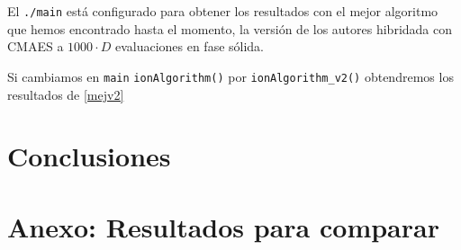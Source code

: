 \documentclass[a4paper,11pt]{article}
\begin{document}
El \texttt{./main} está configurado para obtener los resultados con el mejor algoritmo que hemos encontrado hasta el momento,
la versión de los autores hibridada con CMAES a $1000\cdot D$ evaluaciones en fase sólida.

Si cambiamos en \texttt{main} \texttt{ionAlgorithm()} por \texttt{ionAlgorithm\_v2()} obtendremos los resultados de \ref{mejv2}



\section{Conclusiones}


\section{Anexo: Resultados para comparar}
\end{document}
